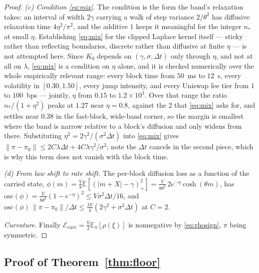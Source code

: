 \documentclass[runningheads]{llncs}
\newcommand{\E}{\mathbb{E}}
\newcommand{\dt}{\Delta t}
\newcommand{\1}{\mathbf{1}}
\begin{document}
\begin{proof}
\emph{(c) Condition \eqref{eq:mix}.} The condition is the form the band's relaxation takes: an interval of width $2\gamma$ carrying a walk of step variance $2/\theta^2$ has diffusive relaxation time $4\eta^2/\pi^2$, and the additive $1$ keeps it meaningful for the integer $n_*$ at small $\eta$. Establishing \eqref{eq:mix} for the clipped Laplace kernel itself --- sticky rather than reflecting boundaries, discrete rather than diffusive at finite $\eta$ --- is not attempted here. Since $K_0$ depends on $(\gamma,\sigma,\dt)$ only through $\eta$, and not at all on $\lambda$, \eqref{eq:mix} is a condition on $\eta$ alone, and it is checked numerically over the whole empirically relevant range: every block time from $50$~ms to $12$~s, every volatility in $[0.30,1.50]$, every jump intensity, and every Uniswap fee tier from $1$ to $100$~bps --- jointly, $\eta$ from $0.15$ to $1.2\times10^{3}$. Over that range the ratio $n_*/(1+\eta^2)$ peaks at $1.27$ near $\eta=0.8$, against the $2$ that \eqref{eq:mix} asks for, and settles near $0.38$ in the fast-block, wide-band corner, so the margin is smallest where the band is narrow relative to a block's diffusion and only widens from there. Substituting $\eta^2=2\gamma^2/(\sigma^2\dt)$ into \eqref{eq:mix} gives $\|\pi-\pi_0\|\le 2C\lambda\dt+4C\lambda\gamma^2/\sigma^2$; note the $\dt$ cancels in the second piece, which is why this term does not vanish with the block time.

\emph{(d) From law shift to rate shift.} The per-block diffusion loss as a function of the carried state, $\phi(m)=\tfrac{V}{8}\E[(|m+X|-\gamma)_+^2] = \tfrac{V}{8\theta^2}\,2e^{-\eta}\cosh(\theta m)$, has $\mathrm{osc}(\phi)=\tfrac{V}{8\theta^2}(1-e^{-\eta})^2\le V\sigma^2\dt/16$, and $\mathrm{osc}(\phi)\,\|\pi-\pi_0\|/\dt \le \tfrac{\lambda V}{4}(2\gamma^2+\sigma^2\dt)$ at $C=2$.

\emph{Curvature.} Finally $\mathcal{E}_{\mathrm{curv}} = \tfrac{V}{2}\E_\pi[\rho(\xi)]$ is nonnegative by \eqref{eq:rhosign}, $\pi$ being symmetric.
\end{proof}

\subsection{Proof of Theorem~\ref{thm:floor}}\label{app:floor}
\end{document}
